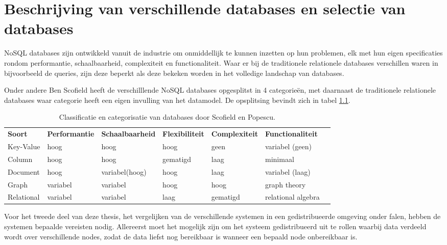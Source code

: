 \chapter{Beschrijving van verschillende databases en selectie van databases}
NoSQL databases zijn ontwikkeld vanuit de industrie om onmiddellijk te kunnen inzetten op hun problemen, elk met hun eigen specificaties rondom performantie, schaalbaarheid, complexiteit en functionaliteit. Waar er bij de traditionele relationele databases verschillen waren in bijvoorbeeld de queries, zijn deze beperkt als deze bekeken worden in het volledige landschap van databases. 

Onder andere Ben Scofield heeft de verschilllende NoSQL databases opgesplitst in 4 categorieën, met daarnaast de traditionele relationele databases waar categorie heeft een eigen invulling van het datamodel. De opsplitsing bevindt zich in tabel \ref{table:selectie-classificatie}\cite{Strauch.NoSQL}.
\begin{table}[!h]
	\resizebox{\textwidth}{!} {
		\begin{tabular}{l l l l l l l}
			\textbf{Soort} & \textbf{Performantie} & \textbf{Schaalbaarheid} & 			\textbf{Flexibiliteit} & \textbf{Complexiteit} & \textbf{Functionaliteit} \\
			Key-Value & hoog & hoog & hoog & geen & variabel (geen) \\
			Column & hoog & hoog & gematigd & laag & minimaal \\
			Document & hoog & variabel(hoog) & hoog & laag & variabel (laag) \\
			Graph & variabel & variabel & hoog & hoog & graph theory \\
			Relational & variabel & variabel & laag & gematigd & relational algebra \\
		\end{tabular}
	}
	\label{table:selectie-classificatie}
	\caption{Classificatie en categorisatie van databases door Scofield en Popescu. \cite{categorizatie-sco10} \cite{categorizatie-pop10b} }
\end{table}

Voor het tweede deel van deze thesis, het vergelijken van de verschillende systemen in een gedistribueerde omgeving onder falen, hebben de systemen bepaalde vereisten nodig. Allereerst moet het mogelijk zijn om het systeem gedistribueerd uit te rollen waarbij data verdeeld wordt over verschillende nodes, zodat de data liefst nog bereikbaar is wanneer een bepaald node onbereikbaar is. 

